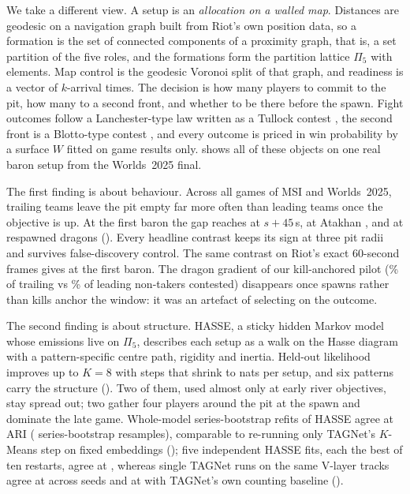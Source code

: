 We take a different view. A setup is an \emph{allocation on a walled map}.
Distances are geodesic on a navigation graph built from Riot's own position data, so a formation is the set of connected components of a proximity graph, that is, a set partition of the five roles, and the formations form the partition lattice $\Pi_5$ with  elements.
Map control is the geodesic Voronoi split of that graph, and readiness is a vector of $k$-arrival times.
The decision is how many players to commit to the pit, how many to a second front, and whether to be there before the spawn.
Fight outcomes follow a Lanchester-type law \citep{lanchester1916aircraft} written as a Tullock contest \citep{tullock1980efficient}, the second front is a Blotto-type contest \citep{roberson2006colonel}, and every outcome is priced in win probability by a surface $W$ fitted on game results only.
 shows all of these objects on one real baron setup from the Worlds~2025 final.

The first finding is about behaviour. Across all  games of MSI and Worlds~2025, trailing teams leave the pit empty far more often than leading teams once the objective is up.
At the first baron the gap reaches \pp{}  at $s{+}45$\,s, at Atakhan \pp{} , and at respawned dragons \pp{}  ().
Every headline contrast keeps its sign at three pit radii and survives false-discovery control.
The same contrast on Riot's exact 60-second frames gives \pp{}  at the first baron.
The dragon gradient of our kill-anchored pilot (\% of trailing vs \% of leading non-takers contested) disappears once spawns rather than kills anchor the window: it was an artefact of selecting on the outcome.

The second finding is about structure. HASSE, a sticky hidden Markov model whose emissions live on $\Pi_5$, describes each setup as a walk on the Hasse diagram with a pattern-specific centre path, rigidity and inertia.
Held-out likelihood improves up to $K=8$ with steps that shrink to  nats per setup, and six patterns carry the structure ().
Two of them, used almost only at early river objectives, stay spread out; two gather four players around the pit at the spawn and dominate the late game.
Whole-model series-bootstrap refits of HASSE agree at ARI  ( series-bootstrap resamples), comparable to re-running only TAGNet's $K$-Means step on fixed embeddings (); five independent HASSE fits, each the best of ten restarts, agree at , whereas single TAGNet runs on the same V-layer tracks agree at  across seeds and at  with TAGNet's own counting baseline ().

